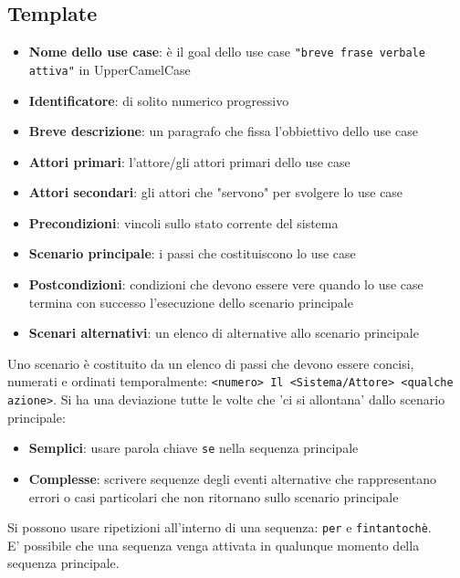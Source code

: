 \documentclass[12pt, a4paper]{report}
\begin{document}
\subsection{Template}
\begin{itemize}
    \item \textbf{Nome dello use case}: è il goal dello use case \texttt{"breve frase verbale attiva"} in UpperCamelCase
    \item \textbf{Identificatore}: di solito numerico progressivo
    \item \textbf{Breve descrizione}: un paragrafo che fissa l'obbiettivo dello use case
    \item \textbf{Attori primari}: l'attore/gli attori primari dello use case
    \item \textbf{Attori secondari}: gli attori che "servono" per svolgere lo use case
    \item \textbf{Precondizioni}: vincoli sullo stato corrente del sistema
    \item \textbf{Scenario principale}: i passi che costituiscono lo use case
    \item \textbf{Postcondizioni}: condizioni che devono essere vere quando lo use case termina con successo l'esecuzione dello scenario principale
    \item \textbf{Scenari alternativi}: un elenco di alternative allo scenario principale
\end{itemize}
Uno scenario è costituito da un elenco di passi che devono essere concisi, numerati e ordinati temporalmente: \texttt{<numero> Il <Sistema/Attore> <qualche azione>}. Si ha una deviazione tutte le volte che 'ci si allontana' dallo scenario principale: \begin{itemize}
    \item \textbf{Semplici}: usare parola chiave \texttt{se} nella sequenza principale
    \item \textbf{Complesse}: scrivere sequenze degli eventi alternative che rappresentano errori o casi particolari che non ritornano sullo scenario principale
\end{itemize}
Si possono usare ripetizioni all'interno di una sequenza: \texttt{per} e \texttt{fintantochè}.\\
E' possibile che una sequenza venga attivata in qualunque momento della sequenza principale.
\end{document}

